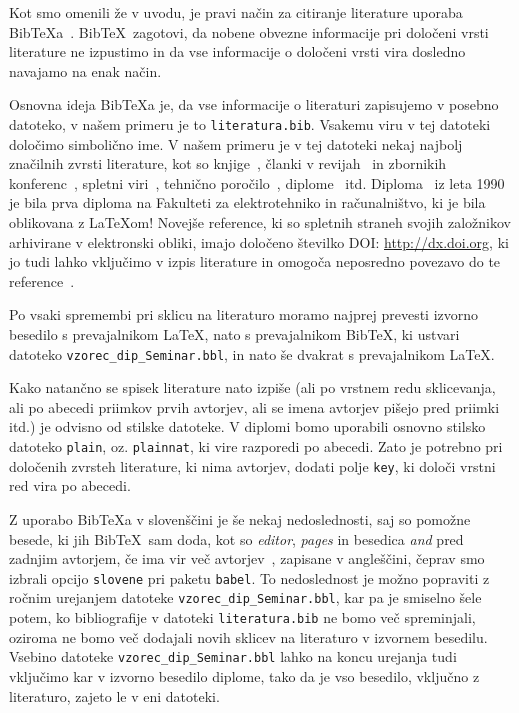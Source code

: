 \documentclass[a4paper, 12pt]{book}
\newcommand{\BibTeX}{{\sc Bib}\TeX}
\begin{document}
{{Kot smo omenili že v uvodu, je pravi način za citiranje literature uporaba \BibTeX{}a~\cite{bib}. 
\BibTeX\ zagotovi, da nobene obvezne informacije pri določeni vrsti literature ne izpustimo in da vse informacije o določeni vrsti vira dosledno navajamo na enak način.

Osnovna ideja \BibTeX{a} je, da vse informacije o literaturi zapisujemo v posebno datoteko, v našem primeru je to \texttt{literatura.bib}.
Vsakemu viru v tej datoteki določimo simbolično ime.
V  našem primeru je v tej datoteki nekaj najbolj značilnih zvrsti literature, kot so knjige~\cite{lamport}, 
članki v revijah~\cite{leonardo} in zbornikih konferenc~\cite{poglavje_springer}, 
spletni viri~\cite{bib,slovarcek,video}, 
tehnično poročilo~\cite{andersen2012kinect}, 
diplome~\cite{diploma} itd.
Diploma~\cite{diploma} iz leta 1990 je bila prva diploma na Fakulteti za elektrotehniko in računalništvo, ki je bila oblikovana z \LaTeX om!
Novej\v se reference, ki so spletnih straneh svojih založnikov arhivirane v elektronski obliki, imajo določeno \v stevilko DOI: \url{http://dx.doi.org}, ki jo tudi lahko vključimo v izpis literature in omogoča neposredno povezavo do te reference~\cite{Kljun2018}.

Po vsaki spremembi pri sklicu na literaturo moramo najprej prevesti izvorno besedilo s prevajalnikom \LaTeX, nato s prevajalnikom  \BibTeX, ki ustvari datoteko  {\tt vzorec\_dip\_Seminar.bbl}, in nato še dvakrat s prevajalnikom  \LaTeX.

Kako natančno se spisek literature nato izpiše (ali po vrstnem redu sklicevanja, ali po abecedi priimkov prvih avtorjev, ali se imena avtorjev pišejo pred priimki itd.) je odvisno od stilske datoteke.
V diplomi bomo uporabili osnovno stilsko datoteko \texttt{plain}, oz. \texttt{plainnat}, ki vire razporedi po abecedi.
Zato je potrebno pri določenih zvrsteh literature, ki nima avtorjev, dodati polje \texttt{key}, ki določi vrstni red vira po abecedi.

Z uporabo \BibTeX{a} v slovenščini je še nekaj nedoslednosti, saj so pomožne besede, ki jih \BibTeX\ sam doda,  kot so \textit{editor},  \textit{pages} in besedica  \textit{and} pred zadnjim avtorjem, 
če ima vir več avtorjev~\cite{andersen2012kinect}, zapisane v angleščini,
čeprav smo izbrali opcijo \texttt{slovene} pri paketu \texttt{babel}.
To nedoslednost je možno popraviti z ročnim urejanjem datoteke {\tt vzorec\_dip\_Seminar.bbl}, 
kar pa je smiselno šele potem, ko bibliografije v datoteki \texttt{literatura.bib} ne bomo več spreminjali,
oziroma ne bomo več dodajali novih sklicev na literaturo v izvornem besedilu.
Vsebino datoteke {\tt vzorec\_dip\_Seminar.bbl} lahko na koncu urejanja tudi vključimo kar v izvorno besedilo diplome, tako da je vso besedilo, vključno z literaturo, zajeto le v eni datoteki.

}}
\end{document}
